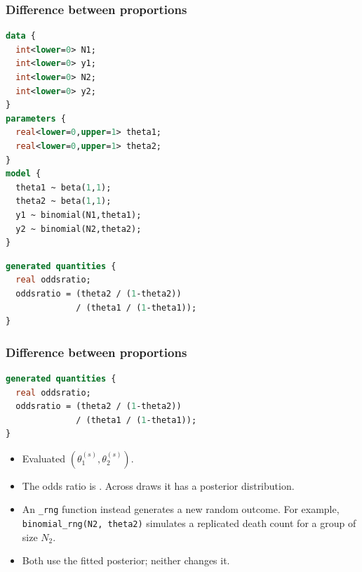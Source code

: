 \documentclass[10pt]{beamer}
\begin{document}
\begin{frame}[fragile]

\frametitle{Difference between proportions}


  {\small\color{gray}
    \lstset{aboveskip=3pt,belowskip=3pt}
    {
\begin{lstlisting}[language=Stan]
data {
  int<lower=0> N1;
  int<lower=0> y1;
  int<lower=0> N2;
  int<lower=0> y2;
}
parameters {
  real<lower=0,upper=1> theta1;
  real<lower=0,upper=1> theta2;
}
model {
  theta1 ~ beta(1,1);
  theta2 ~ beta(1,1);
  y1 ~ binomial(N1,theta1);
  y2 ~ binomial(N2,theta2);
}
\end{lstlisting}
    }
    {
\begin{lstlisting}[language=Stan]
generated quantities {
  real oddsratio;
  oddsratio = (theta2 / (1-theta2))
              / (theta1 / (1-theta1));
}
\end{lstlisting}
    }
  }
\end{frame}

\begin{frame}[fragile]

\frametitle{Difference between proportions}


  {\small
\begin{lstlisting}[language=Stan]
generated quantities {
  real oddsratio;
  oddsratio = (theta2 / (1-theta2))
              / (theta1 / (1-theta1));
}
\end{lstlisting}
    }

    \begin{itemize}
    \item Evaluated 
      $(\theta_1^{(s)},\theta_2^{(s)})$.
    \item The odds ratio is .
      Across draws it has a posterior distribution.
    \pause
    \item An \texttt{\_rng} function instead generates a new random outcome.
      For example, \texttt{binomial\_rng(N2, theta2)} simulates a
      replicated death count for a group of size $N_2$.
    \item Both use the fitted posterior; neither changes it.
    \end{itemize}

\end{frame}
\end{document}
